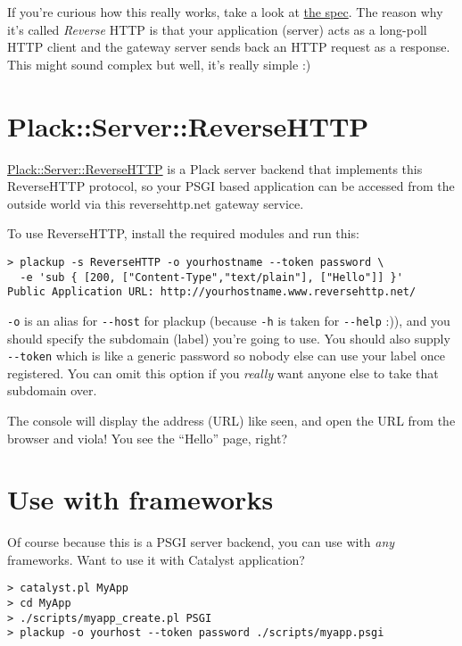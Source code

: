 If you're curious how this really works, take a look at
\href{http://www.reversehttp.net/specs.html}{the spec}. The reason why
it's called \emph{Reverse} HTTP is that your application (server) acts
as a long-poll HTTP client and the gateway server sends back an HTTP
request as a response. This might sound complex but well, it's really
simple :)

\section{Plack::Server::ReverseHTTP}\label{plackserverreversehttp}

\href{http://search.cpan.org/~miyagawa/Plack-Server-ReverseHTTP-0.01/}{Plack::Server::ReverseHTTP}
is a Plack server backend that implements this ReverseHTTP protocol, so
your PSGI based application can be accessed from the outside world via
this reversehttp.net gateway service.

To use ReverseHTTP, install the required modules and run this:

\begin{lstlisting}
> plackup -s ReverseHTTP -o yourhostname --token password \
  -e 'sub { [200, ["Content-Type","text/plain"], ["Hello"]] }'
Public Application URL: http://yourhostname.www.reversehttp.net/
\end{lstlisting}

\lstinline!-o! is an alias for \lstinline!--host! for plackup (because
\lstinline!-h! is taken for \lstinline!--help! :)), and you should
specify the subdomain (label) you're going to use. You should also
supply \lstinline!--token! which is like a generic password so nobody
else can use your label once registered. You can omit this option if you
\emph{really} want anyone else to take that subdomain over.

The console will display the address (URL) like seen, and open the URL
from the browser and viola! You see the ``Hello'' page, right?

\section{Use with frameworks}\label{use-with-frameworks}

Of course because this is a PSGI server backend, you can use with
\emph{any} frameworks. Want to use it with Catalyst application?

\begin{lstlisting}
> catalyst.pl MyApp
> cd MyApp
> ./scripts/myapp_create.pl PSGI
> plackup -o yourhost --token password ./scripts/myapp.psgi
\end{lstlisting}


